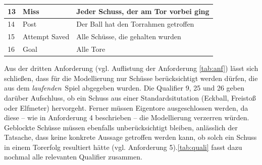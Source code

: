 \tablelasttail{}
\begin{center}%
\begin{supertabular}{ | P{2cm} | P{3cm} | P{5cm} |}
\vspace*{1mm} 13 	& \vspace*{1mm}Miss  	& Jeder Schuss, der am Tor vorbei ging	\\
\hline
\vspace*{1mm}14	& \vspace*{1mm}Post	& Der Ball hat den Torrahmen getroffen 	\\
\hline
\vspace*{1mm}15	& \vspace*{1mm}Attempt Saved  	& Alle Schüsse, die gehalten wurden	\\
\hline
\vspace*{1mm}16\vspace*{1mm}	& \vspace*{1mm}Goal\vspace*{1mm}  	& \vspace*{1mm}Alle Tore\vspace*{1mm}	\\
\hline
\end{supertabular}
\end{center}

Aus der dritten Anforderung (vgl. Auflistung der Anforderung \vref{tab:anf}) lässt sich schließen, dass für die Modellierung nur Schüsse berücksichtigt werden dürfen, die aus dem \glqq \textit{laufenden}\grqq~Spiel abgegeben wurden. Die Qualifier \textsf{9, 25} und \textsf{26} geben darüber Aufschluss, ob ein Schuss aus einer Standardsitutation (Eckball, Freistoß oder Elfmeter) hervorgeht. Ferner müssen Eigentore ausgeschlossen werden, da diese -- wie in Anforderung 4 beschrieben -- die Modellierung verzerren würden. Geblockte Schüsse müssen ebenfalls unberücksichtigt bleiben, anlässlich der Tatsache, dass keine konkrete Aussage getroffen werden kann, ob solch ein Schuss in einem Torerfolg resultiert hätte (vgl. Anforderung 5).\vref{tab:quali} fasst dazu nochmal alle relevanten Qualifier zusammen.

